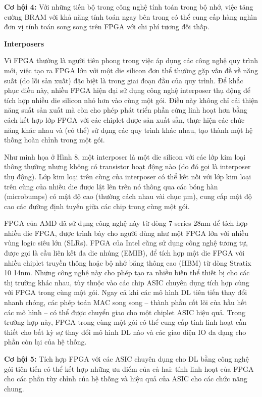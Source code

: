\documentclass[a4paper]{article}
\begin{document}
\textbf{Cơ hội 4:} Với những tiến bộ trong công nghệ tính toán trong bộ nhớ, việc tăng cường BRAM với khả năng tính toán ngay bên trong có thể cung cấp hàng nghìn đơn vị tính toán song song trên FPGA với chi phí tương đối thấp.

\textbf{Interposers}

Vì FPGA thường là người tiên phong trong việc áp dụng các công nghệ quy trình mới, việc tạo ra FPGA lớn với một die silicon đơn thể thường gặp vấn đề về năng suất (do lỗi sản xuất) đặc biệt là trong giai đoạn đầu của quy trình. Để khắc phục điều này, nhiều FPGA hiện đại sử dụng công nghệ interposer thụ động để tích hợp nhiều die silicon nhỏ hơn vào cùng một gói. Điều này không chỉ cải thiện năng suất sản xuất mà còn cho phép phát triển phần cứng linh hoạt hơn bằng cách kết hợp lớp FPGA với các chiplet được sản xuất sẵn, thực hiện các chức năng khác nhau và (có thể) sử dụng các quy trình khác nhau, tạo thành một hệ thống hoàn chỉnh trong một gói.

Như minh họa ở Hình 8, một interposer là một die silicon với các lớp kim loại thông thường nhưng không có transistor hoạt động nào (do đó gọi là interposer thụ động). Lớp kim loại trên cùng của interposer có thể kết nối với lớp kim loại trên cùng của nhiều die được lật lên trên nó thông qua các bóng hàn (microbumps) có mật độ cao (thường cách nhau vài chục µm), cung cấp mật độ cao các đường định tuyến giữa các chip trong cùng một gói.

FPGA của AMD đã sử dụng công nghệ này từ dòng 7-series 28nm để tích hợp nhiều die FPGA, được trình bày cho người dùng như một FPGA lớn với nhiều vùng logic siêu lớn (SLRs). FPGA của Intel cũng sử dụng công nghệ tương tự, được gọi là cầu liên kết đa die nhúng (EMIB), để tích hợp một die FPGA với nhiều chiplet truyền thông hoặc bộ nhớ băng thông cao (HBM) từ dòng Stratix 10 14nm. Những công nghệ này cho phép tạo ra nhiều biến thể thiết bị cho các thị trường khác nhau, tùy thuộc vào các chip ASIC chuyên dụng tích hợp cùng với FPGA trong cùng một gói. Ngay cả khi các mô hình DL tiên tiến thay đổi nhanh chóng, các phép toán MAC song song – thành phần cốt lõi của hầu hết các mô hình – có thể được chuyển giao cho một chiplet ASIC hiệu quả. Trong trường hợp này, FPGA trong cùng một gói có thể cung cấp tính linh hoạt cần thiết cho bất kỳ sự thay đổi mô hình DL nào và các giao diện IO đa dạng cho phần còn lại của hệ thống.

\textbf{Cơ hội 5:} Tích hợp FPGA với các ASIC chuyên dụng cho DL bằng công nghệ gói tiên tiến có thể kết hợp những ưu điểm của cả hai: tính linh hoạt của FPGA cho các phần tùy chỉnh của hệ thống và hiệu quả của ASIC cho các chức năng chung.
\end{document}
